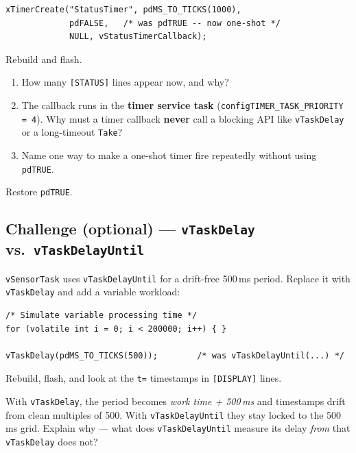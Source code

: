 \documentclass[11pt, a4paper]{article}
\newcommand{\api}[1]{\texttt{\small #1}}
\begin{document}
\begin{lstlisting}[style=cstyle]
xTimerCreate("StatusTimer", pdMS_TO_TICKS(1000),
             pdFALSE,   /* was pdTRUE -- now one-shot */
             NULL, vStatusTimerCallback);
\end{lstlisting}

Rebuild and flash.

\begin{questionbox}[~4]
  \begin{enumerate}[label=(\alph*), noitemsep, leftmargin=*]
    \item How many \texttt{[STATUS]} lines appear now, and why?
    \item The callback runs in the \textbf{timer service task}
          (\texttt{configTIMER\_TASK\_PRIORITY = 4}).  Why must a timer callback
          \textbf{never} call a blocking API like \api{vTaskDelay} or a long-timeout
          \api{Take}?
    \item Name one way to make a one-shot timer fire repeatedly without using
          \texttt{pdTRUE}.
  \end{enumerate}
\end{questionbox}

Restore \texttt{pdTRUE}.

\subsection{Challenge (optional) --- \texttt{vTaskDelay} vs.\ \texttt{vTaskDelayUntil}}

\texttt{vSensorTask} uses \api{vTaskDelayUntil} for a drift-free 500\,ms period.
Replace it with \api{vTaskDelay} and add a variable workload:

\begin{lstlisting}[style=cstyle]
/* Simulate variable processing time */
for (volatile int i = 0; i < 200000; i++) { }

vTaskDelay(pdMS_TO_TICKS(500));        /* was vTaskDelayUntil(...) */
\end{lstlisting}

Rebuild, flash, and look at the \texttt{t=} timestamps in \texttt{[DISPLAY]} lines.

\begin{questionbox}[~Challenge]
  With \api{vTaskDelay}, the period becomes \emph{work time + 500\,ms} and timestamps
  drift from clean multiples of 500.  With \api{vTaskDelayUntil} they stay locked to
  the 500\,ms grid.  Explain why --- what does \api{vTaskDelayUntil} measure its delay
  \emph{from} that \api{vTaskDelay} does not?
\end{questionbox}
\end{document}
